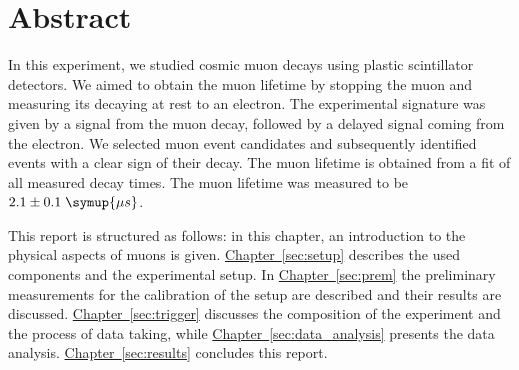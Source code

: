 \thispagestyle{plain}
\section*{Abstract}
In this experiment, we studied cosmic muon decays using plastic scintillator detectors.
We aimed to obtain the muon lifetime by stopping the muon and measuring its decaying at 
rest to an electron. The experimental signature was given by a signal from the muon decay,
followed by a delayed signal coming from the electron. We selected muon event candidates 
and subsequently identified events with a clear sign of their decay. The muon lifetime
is obtained from a fit of all measured decay times.
The muon lifetime was measured to be $2.1 \pm 0.1 \; \symup{\mu s}$.


This report is structured as follows: in this chapter, an introduction to the physical aspects of muons is given.
\hyperref[sec:setup]{Chapter~\ref*{sec:setup}} describes the used components and the experimental setup. In \hyperref[sec:prem]{Chapter~\ref*{sec:prem}}
the preliminary measurements for the calibration of the setup are described and their results are discussed. \hyperref[sec:trigger]{Chapter~\ref*{sec:trigger}} discusses the composition of the experiment and the process of data taking, while \hyperref[sec:data_analysis]{Chapter~\ref*{sec:data_analysis}} presents the data analysis. \hyperref[sec:results]{Chapter~\ref*{sec:results}} concludes this report.
